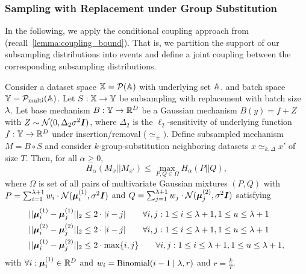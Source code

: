 \subsubsection{Sampling with Replacement under Group Substitution}
In the following, we apply the conditional coupling approach from~\cite{schuchardt2024unified} (recall~\cref{lemma:coupling_bound}).
That is, we partition the support of our subsampling distributions into events
and define a joint coupling between the corresponding subsampling distributions.
\begin{lemma}\label{lemma:group_substitution_wr_objective}
    Consider a dataset space ${\mathbb{X}} = \mathcal{P}({\mathbb{A}})$ with underlying set ${\mathbb{A}}$.
    and batch space ${\mathbb{Y}} = \mathcal{P}_\mathrm{multi}({\mathbb{A}})$.
    Let $S : {\mathbb{X}} \rightarrow {\mathbb{Y}}$ be subsampling with replacement with batch size $\lambda$.
    Let base mechanism $B : {\mathbb{Y}} \rightarrow {\mathbb{R}}^D$ be a Gaussian mechanism $B(y) = f + Z$ with $Z \sim \mathcal{N}(0,\Delta_2 \sigma^2 {\bm{I}})$, where $\Delta_2$ is the $\ell_2$-sensitivity of underlying function $f : {\mathbb{Y}} \rightarrow {\mathbb{R}}^D$
    under insertion/removal ($\simeq_\pm)$.
    Define subsampled mechanism $M = B \circ S$
    and consider $k$-group-substitution neighboring datasets $x \simeq_{k,\Delta} x'$ of size $T$.
    Then, for all $\alpha \geq 0$,
    \begin{equation}
        H_\alpha(M_x || M_{x'}) \leq \max_{P, Q \in \Omega} H_\alpha(P || Q),
    \end{equation}
    where $\Omega$ is set of all pairs of multivariate Gaussian mixtures $(P,Q)$
    with 
    $P = \sum_{i=1}^{\lambda + 1} w_i \cdot \mathcal{N}({\bm{\mu}}^{(1)}_{i}, \sigma^2 {\bm{I}})$
    and
    $Q = \sum_{j=1}^{\lambda + 1} w_j \cdot \mathcal{N}({\bm{\mu}}^{(2)}_{j}, \sigma^2 {\bm{I}})$
    satisfying
    \begin{align}\label{eq:group_substituion_wr_constraints}
        \begin{split}
        & ||{\bm{\mu}}^{(1)}_i - {\bm{\mu}}^{(1)}_j||_2 \leq 2 \cdot | i - j|   \qquad \forall i,j : 1 \leq i  \leq \lambda + 1, 1 \leq u \leq \lambda + 1 \\
        & ||{\bm{\mu}}^{(2)}_i - {\bm{\mu}}^{(2)}_j||_2 \leq 2 \cdot | i -  j|   \qquad  \forall i,j : 1 \leq i  \leq \lambda + 1, 1 \leq u \leq \lambda + 1\\
        & ||{\bm{\mu}}^{(1)}_i - {\bm{\mu}}^{(2)}_j||_2 \leq 2 \cdot \max \{ i, j \}   \qquad \forall i,j : 1 \leq i  \leq \lambda + 1, 1 \leq u \leq \lambda + 1, 
        \end{split}
    \end{align}
    with $\forall i  : {\bm{\mu}}^{(1)}_i \in {\mathbb{R}}^D$ and $w_i = \mathrm{Binomial}(i - 1 \mid \lambda, r)$ and $r = \frac{k}{T}$.
\end{lemma}
